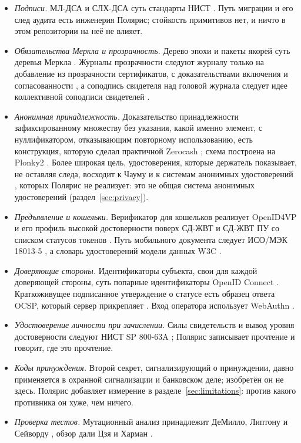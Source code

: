 \begin{itemize}
  \item \emph{Подписи.} МЛ-ДСА и СЛХ-ДСА суть стандарты НИСТ \cite{fips204,fips205}. Путь миграции
    и его след аудита есть инженерия Полярис; стойкость примитивов нет, и ничто в этом репозитории
    на неё не влияет.
  \item \emph{Обязательства Меркла и прозрачность.} Дерево эпохи и пакеты якорей суть деревья Меркла
    \cite{merkle1988}. Журналы прозрачности следуют журналу только на добавление из прозрачности
    сертификатов, с доказательствами включения и согласованности \cite{rfc6962}, а соподпись
    свидетеля над головой журнала следует идее коллективной соподписи свидетелей \cite{syta2016}.
  \item \emph{Анонимная принадлежность.} Доказательство принадлежности зафиксированному множеству без
    указания, какой именно элемент, с нуллификатором, отказывающим повторному использованию, есть
    конструкция, которую сделал практичной Zerocash \cite{zerocash2014}; схема построена на Plonky2
    \cite{plonky2}. Более широкая цель, удостоверения, которые держатель показывает, не оставляя
    следа, восходит к Чауму \cite{chaum1985} и к системам анонимных удостоверений \cite{camlys2001},
    которых Полярис не реализует: это не общая система анонимных удостоверений
    (раздел~\ref{sec:privacy}).
  \item \emph{Предъявление и кошельки.} Верификатор для кошельков реализует OpenID4VP и его профиль
    высокой достоверности \cite{oid4vp,haip} поверх СД-ЖВТ и СД-ЖВТ ПУ \cite{sdjwt,sdjwtvc} со
    списком статусов токенов \cite{statuslist}. Путь мобильного документа следует ИСО/МЭК 18013-5
    \cite{iso18013}, а словарь удостоверений модели данных W3C \cite{vcdm2}.
  \item \emph{Доверяющие стороны.} Идентификаторы субъекта, свои для каждой доверяющей стороны, суть
    попарные идентификаторы OpenID Connect \cite{oidc}. Краткоживущее подписанное утверждение о
    статусе есть образец ответа OCSP, который сервер прикрепляет \cite{rfc6960}. Вход оператора
    использует WebAuthn \cite{webauthn2}.
  \item \emph{Удостоверение личности при зачислении.} Силы свидетельств и вывод уровня достоверности
    следуют НИСТ SP 800-63A \cite{sp80063a}; Полярис записывает прочтение и говорит, где это
    прочтение.
  \item \emph{Коды принуждения.} Второй секрет, сигнализирующий о принуждении, давно применяется в
    охранной сигнализации и банковском деле; изобретён он не здесь. Полярис добавляет измерение в
    разделе~\ref{sec:limitations}: против какого противника он хуже, чем ничего.
  \item \emph{Проверка тестов.} Мутационный анализ принадлежит ДеМилло, Липтону и Сейворду
    \cite{demillo1978}, обзор дали Цзя и Харман \cite{jia2011}.
\end{itemize}

